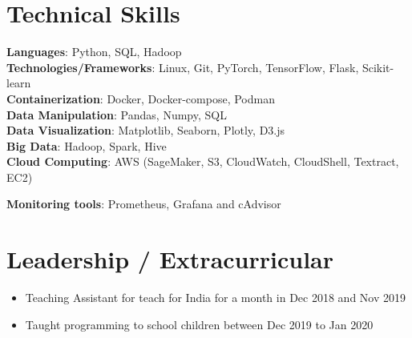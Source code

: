\documentclass[letterpaper,10pt]{article}
\newcommand{\resumeItem}[1]{
  \item\small{
    {#1 \vspace{-2pt}}
  }
}
\newcommand{\resumeItemListStart}{\begin{itemize}}
\newcommand{\resumeItemListEnd}{\end{itemize}\vspace{-5pt}}
\begin{document}
%
\section{Technical Skills}
 \begin{itemize}
    \small{\item{
    \textbf{Languages}{: Python, SQL, Hadoop} \\
\textbf{Technologies/Frameworks}{: Linux, Git, PyTorch, TensorFlow, Flask, Scikit-learn} \\
\textbf{Containerization}{: Docker, Docker-compose, Podman} \\
\textbf{Data Manipulation}{: Pandas, Numpy, SQL} \\
\textbf{Data Visualization}{: Matplotlib, Seaborn, Plotly, D3.js} \\
\textbf{Big Data}{: Hadoop, Spark, Hive} \\
\textbf{Cloud Computing}{: AWS (SageMaker, S3,  CloudWatch,  CloudShell,  Textract,  EC2) } \\
    }}
\textbf{Monitoring tools}{: Prometheus, Grafana and cAdvisor}
 \end{itemize}
 \vspace{-16pt}


\section{Leadership / Extracurricular}
            \resumeItemListStart
                \resumeItem{Teaching Assistant for teach for India for a month in Dec 2018 and Nov 2019}
                \resumeItem{Taught programming to school children between Dec 2019 to Jan 2020}
            \resumeItemListEnd
\end{document}
